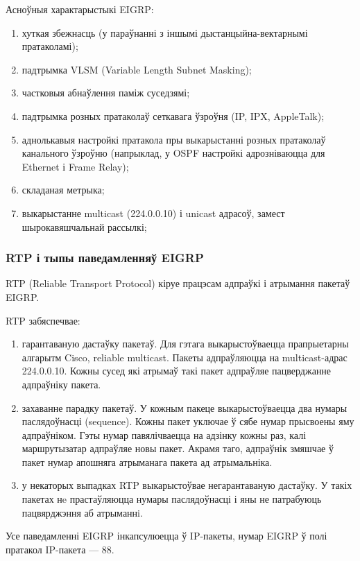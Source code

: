Асноўныя характарыстыкі EIGRP:
\begin{enumerate}
     \item хуткая збежнасць (у параўнанні з іншымі дыстанцыйна-вектарнымі пратаколамі);
     \item падтрымка VLSM (Variable Length Subnet Masking);
     \item частковыя абнаўлення паміж суседзямі;
     \item падтрымка розных пратаколаў сеткавага ўзроўня (IP, IPX, AppleTalk);
     \item аднолькавыя настройкі пратакола пры выкарыстанні розных пратаколаў канального ўзроўню (напрыклад, у OSPF настройкі адрозніваюцца для Ethernet і Frame Relay);
     \item складаная метрыка;
     \item выкарыстанне multicast (224.0.0.10) і unicast адрасоў, замест шырокавяшчальнай рассылкі;
\end{enumerate}

\subsubsection{RTP і тыпы паведамленняў EIGRP}

RTP (Reliable Transport Protocol) кіруе працэсам адпраўкі і атрымання пакетаў EIGRP.

RTP забяспечвае:
\begin{enumerate}
    \item гарантаваную дастаўку пакетаў. Для гэтага выкарыстоўваецца прапрыетарны алгарытм Cisco, reliable multicast. Пакеты адпраўляюцца на multicast-адрас 224.0.0.10. Кожны сусед які атрымаў такі пакет адпраўляе пацверджанне адпраўніку пакета.
    \item захаванне парадку пакетаў. У кожным пакеце выкарыстоўваецца два нумары паслядоўнасці (sequence). Кожны пакет уключае ў сябе нумар прысвоены яму адпраўніком. Гэты нумар павялічваецца на адзінку кожны раз, калі маршрутызатар адпраўляе новы пакет. Акрамя таго, адпраўнік змяшчае ў пакет нумар апошняга атрыманага пакета ад атрымальніка.
    \item у некаторых выпадках RTP выкарыстоўвае негарантаваную дастаўку. У такіх пакетах нe прастаўляюцца нумары паслядоўнасці і яны не патрабуюць пацвярджэння аб атрыманнi.
\end{enumerate}

Усе паведамленні EIGRP інкапсулюецца ў IP-пакеты, нумар EIGRP ў полі пратакол IP-пакета --- 88.

